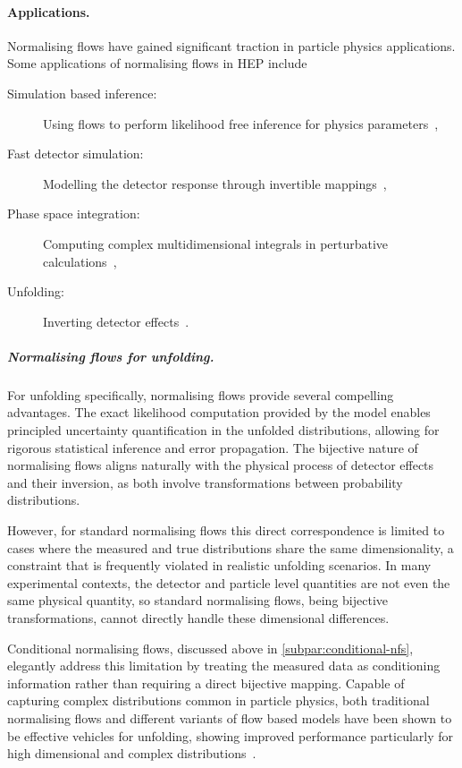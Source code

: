         \paragraph{Applications.}
            Normalising flows have gained significant traction in particle physics applications.
            Some applications of normalising flows in HEP include
            \begin{description}
                \item[Simulation based inference:] Using flows to perform likelihood free inference for physics parameters~\cite{Green2020Gravitational-waveFlows},
                \item[Fast detector simulation:] Modelling the detector response through invertible mappings~\cite{krause_fast_2023},
                \item[Phase space integration:] Computing complex multidimensional integrals in perturbative calculations~\cite{Winterhalder2022TargetingNetworks},
                \item[Unfolding:] Inverting detector effects~\cite{zeng_solving_2024}.
            \end{description}
            
            \subparagraph{Normalising flows for unfolding.}
                For unfolding specifically, normalising flows provide several compelling advantages.
                The exact likelihood computation provided by the model enables principled uncertainty quantification in the unfolded distributions, allowing for rigorous statistical inference and error propagation.
                The bijective nature of normalising flows aligns naturally with the physical process of detector effects and their inversion, as both involve transformations between probability distributions.
                
                However, for standard normalising flows this direct correspondence is limited to cases where the measured and true distributions share the same dimensionality, a constraint that is frequently violated in realistic unfolding scenarios.
                In many experimental contexts, the detector and particle level quantities are not even the same physical quantity, so standard normalising flows, being bijective transformations, cannot directly handle these dimensional differences.
                
                Conditional normalising flows, discussed above in \cref{subpar:conditional-nfs}, elegantly address this limitation by treating the measured data as conditioning information rather than requiring a direct bijective mapping.
                Capable of capturing complex distributions common in particle physics, both traditional normalising flows and different variants of flow based models have been shown to be effective vehicles for unfolding, showing improved performance particularly for high dimensional and complex distributions~\cite{bellagente_go_2022}.

